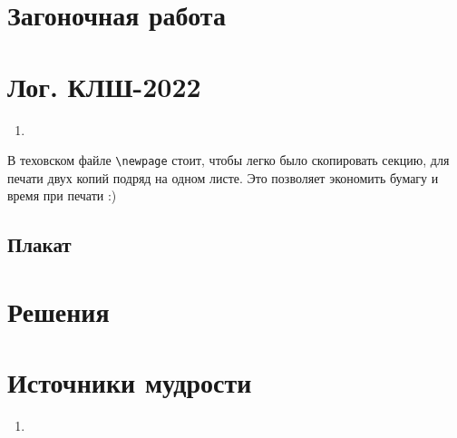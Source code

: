\documentclass[12pt]{article}
\newcounter{problem}[section]
\theoremstyle{definition}
\begin{document}
\section{Загоночная работа}





\newpage

\section{Лог. КЛШ-2022}

\begin{enumerate}
  \item 
\end{enumerate}

В теховском файле \verb|\newpage| стоит, чтобы легко было скопировать секцию, для печати двух копий подряд на одном листе.
Это позволяет экономить бумагу и время при печати :)

\subsection{Плакат}






\renewenvironment{solution}[1]{%
         \vskip .5cm plus 2cm minus 0.1cm%
         {\bfseries \hyperlink{problem:#1}{#1.}}%
}%
{%
}%



\section{Решения}



\section{Источники мудрости}


\begin{enumerate}
\item 
\end{enumerate}

\printbibliography[heading=none]
\end{document}
